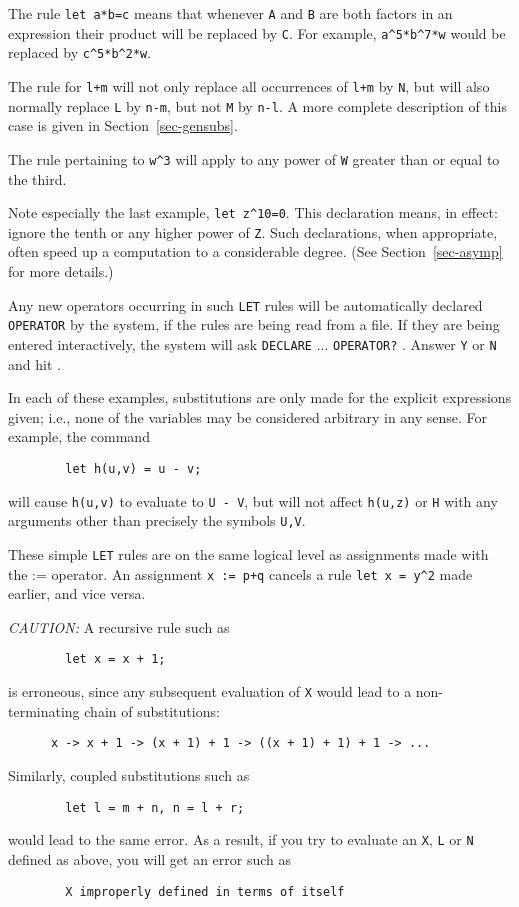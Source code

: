 The rule {\tt let a*b=c} means that whenever {\tt A} and {\tt B} are both
factors in an expression their product will be replaced by {\tt C}.  For
example, {\tt a\verb|^|5*b\verb|^|7*w} would be replaced by
{\tt c\verb|^|5*b\verb|^|2*w}.

The rule for {\tt l+m} will not only replace all occurrences of {\tt l+m}
by {\tt N}, but will also normally replace {\tt L} by {\tt n-m}, but not
{\tt M} by {\tt n-l}.  A more complete description of this case is given
in Section~\ref{sec-gensubs}.

The rule pertaining to {\tt w\verb|^|3} will apply to any power of {\tt W}
greater than or equal to the third.

Note especially the last example, {\tt let z\verb|^|10=0}.  This declaration
means, in effect: ignore the tenth or any higher power of {\tt Z}.  Such
declarations, when appropriate, often speed up a computation to a
considerable degree. (See
Section~\ref{sec-asymp} for more details.)

Any new operators occurring in such {\tt LET} rules will be automatically
declared {\tt OPERATOR} by the system, if the rules are being read from a
file.  If they are being entered interactively, the system will ask
{\tt DECLARE} ... {\tt OPERATOR?} .  Answer {\tt Y} or {\tt N} and hit
.

In each of these examples, substitutions are only made for the explicit
expressions given; i.e., none of the variables may be considered arbitrary
in any sense. For example, the command
\begin{verbatim}
        let h(u,v) = u - v;
\end{verbatim}
will cause {\tt h(u,v)} to evaluate to {\tt U - V}, but will not affect
{\tt h(u,z)} or {\tt H} with any arguments other than precisely the
symbols {\tt U,V}.

These simple {\tt LET} rules are on the same logical level as assignments
made with the := operator.  An assignment {\tt x := p+q} cancels a rule
{\tt let x = y\verb|^|2} made earlier, and vice versa.

{\it CAUTION:} A recursive rule such as
\begin{verbatim}
        let x = x + 1;
\end{verbatim}
is erroneous, since any subsequent evaluation of {\tt X} would lead to a
non-terminating chain of substitutions:
\begin{verbatim}
      x -> x + 1 -> (x + 1) + 1 -> ((x + 1) + 1) + 1 -> ...
\end{verbatim}
Similarly, coupled substitutions such as
\begin{verbatim}
        let l = m + n, n = l + r;
\end{verbatim}
would lead to the same error. As a result, if you try to evaluate an {\tt X},
{\tt L} or {\tt N} defined as above, you will get an error such as
\begin{verbatim}
        X improperly defined in terms of itself
\end{verbatim}

